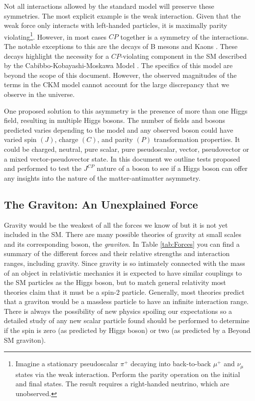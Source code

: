 Not all interactions allowed by the standard model will preserve these symmetries. The most explicit example is the weak interaction. Given that the weak force only interacts with left-handed particles, it is maximally parity violating\footnote{Imagine a stationary pseudoscalar $\pi^{+}$ decaying into back-to-back $\mu^{+}$ and $\nu_{\mu}$ states via the weak interaction. Perform the parity operation on the initial and final states. The result requires a right-handed neutrino, which are unobserved.}. However, in most cases $CP$ together is a symmetry of the interactions. The notable exceptions to this are the decays of B mesons and Kaons \cite{Agashe:2014kda}. These decays highlight the necessity for a $CP$-violating component in the SM described by the Cabibbo-Kobayashi-Moskawa Model \cite{Kobayashi:1973fv}. The specifics of this model are beyond the scope of this document. However, the observed magnitudes of the terms in the CKM model cannot account for the large discrepancy that we observe in the universe.

One proposed solution to this asymmetry is the presence of more than one Higgs field, resulting in multiple Higgs bosons. The number of fields and bosons predicted varies depending to the model and any observed boson could have varied spin $(J)$, charge $(C)$, and parity $(P)$ transformation properties. It could be charged, neutral, pure scalar, pure pseudoscalar, vector, pseudovector or a mixed vector-pseudovector state. In this document we outline tests proposed and performed to test the $J^{CP}$ nature of a boson to see if a Higgs boson can offer any insights into the nature of the matter-antimatter asymmetry.

\subsection{The Graviton: An Unexplained Force}
\label{sec:Graviton}

Gravity would be the weakest of all the forces we know of but it is not yet included in the SM. There are many possible theories of gravity at small scales and its corresponding boson, the \textit{graviton}. In Table \ref{tab:Forces} you can find a summary of the different forces and their relative strengths and interaction ranges, including gravity. Since gravity is so intimately connected with the mass of an object in relativistic mechanics it is expected to have similar couplings to the SM particles as the Higgs boson, but to match general relativity most theories claim that it must be a spin-2 particle. Generally, most theories predict that a graviton would be a massless particle to have an infinite interaction range. There is always the possibility of new physics spoiling our expectations so a detailed study of any new scalar particle found should be performed to determine if the spin is zero (as predicted by Higgs boson) or two (as predicted by a Beyond SM graviton).

